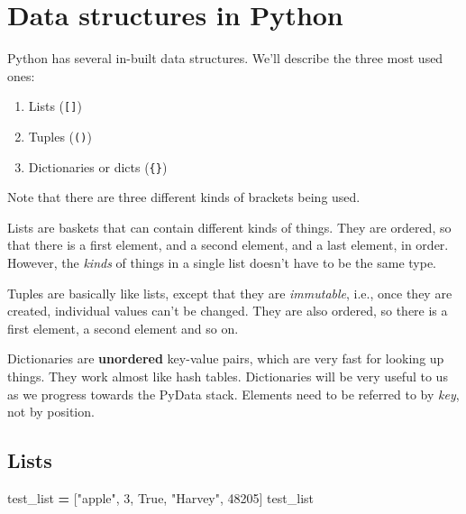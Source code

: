 \documentclass[
  letterpaper,
]{scrbook}
\newenvironment{Shaded}{\begin{snugshade}}{\end{snugshade}}
\newcommand{\DecValTok}[1]{\textcolor[rgb]{0.00,0.00,0.81}{#1}}
\newcommand{\NormalTok}[1]{#1}
\newcommand{\OperatorTok}[1]{\textcolor[rgb]{0.81,0.36,0.00}{\textbf{#1}}}
\newcommand{\StringTok}[1]{\textcolor[rgb]{0.31,0.60,0.02}{#1}}
\newcommand{\VariableTok}[1]{\textcolor[rgb]{0.00,0.00,0.00}{#1}}
\providecommand{\tightlist}{%
  \setlength{\itemsep}{0pt}\setlength{\parskip}{0pt}}
\begin{document}
\hypertarget{data-structures-in-python}{%
\section{Data structures in Python}\label{data-structures-in-python}}

Python has several in-built data structures. We'll describe the three most used ones:

\begin{enumerate}
\def\labelenumi{\arabic{enumi}.}
\tightlist
\item
  Lists (\texttt{{[}{]}})
\item
  Tuples (\texttt{()})
\item
  Dictionaries or dicts (\texttt{\{\}})
\end{enumerate}

Note that there are three different kinds of brackets being used.

Lists are baskets that can contain different kinds of things. They are ordered, so that there is a first element, and a second element, and a last element, in order. However, the \emph{kinds} of things in a single list doesn't have to be the same type.

Tuples are basically like lists, except that they are \emph{immutable}, i.e., once they are created, individual values can't be changed. They are also ordered, so there is a first element, a second element and so on.

Dictionaries are \textbf{unordered} key-value pairs, which are very fast for looking up things. They work almost like hash tables. Dictionaries will be very useful to us as we progress towards the PyData stack. Elements need to be referred to by \emph{key}, not by position.

\hypertarget{lists}{%
\subsection{Lists}\label{lists}}

\begin{Shaded}
\begin{Highlighting}[]
\NormalTok{test\_list }\OperatorTok{=}\NormalTok{ [}\StringTok{"apple"}\NormalTok{, }\DecValTok{3}\NormalTok{, }\VariableTok{True}\NormalTok{, }\StringTok{"Harvey"}\NormalTok{, }\DecValTok{48205}\NormalTok{]}
\NormalTok{test\_list}
\end{Highlighting}
\end{Shaded}
\end{document}
